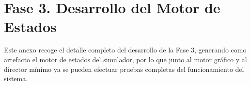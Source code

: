 \documentclass[../main.tex]{subfiles}
\begin{document}
	\chapter{Fase 3. Desarrollo del Motor de Estados}
	\label{sec:DerarrolloFase3}
	
	Este anexo recoge el detalle completo del desarrollo de la Fase 3, generando como artefacto el motor de estados del simulador, por lo que junto al motor gráfico y al director mínimo ya se pueden efectuar pruebas completas del funcionamiento del sistema.
		
	
	
	
	
	
	
	
	
	
	
	
	
	
	
	
	\clearpage
	
\end{document}
